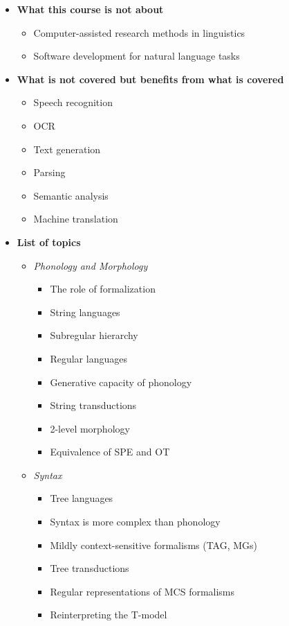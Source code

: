 \begin{itemize}
    \item \textbf{What this course is not about}
        \begin{itemize}
            \item Computer-assisted research methods in linguistics
            \item Software development for natural language tasks
        \end{itemize}
    \item \textbf{What is not covered but benefits from what is covered}
        \begin{itemize}
            \item Speech recognition
            \item OCR
            \item Text generation
            \item Parsing
            \item Semantic analysis
            \item Machine translation
        \end{itemize}
    \item \textbf{List of topics}
        \begin{itemize}
            \item \emph{Phonology and Morphology}
                \begin{itemize}
                    \item The role of formalization
                    \item String languages
                    \item Subregular hierarchy
                    \item Regular languages
                    \item Generative capacity of phonology
                    \item String transductions
                    \item 2-level morphology
                    \item Equivalence of SPE and OT
                \end{itemize}
            \item \emph{Syntax}
                \begin{itemize}
                    \item Tree languages
                    \item Syntax is more complex than phonology
                    \item Mildly context-sensitive formalisms (TAG, MGs)
                    \item Tree transductions
                    \item Regular representations of MCS formalisms
                    \item Reinterpreting the T-model
                \end{itemize}
        \end{itemize}
\end{itemize}

